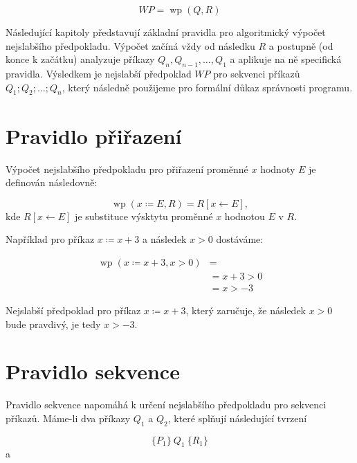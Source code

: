 \begin{equation*}
    WP = \operatorname{wp}(Q, R)
\end{equation*}

Následující kapitoly představují základní pravidla pro algoritmický výpočet nejslabšího předpokladu.
Výpočet začíná vždy od následku $R$ a postupně (od konce k začátku)
analyzuje příkazy $Q_n, Q_{n-1}, \ldots, Q_1$ a aplikuje na ně specifická pravidla.
Výsledkem je nejslabší předpoklad $WP$ pro sekvenci příkazů $Q_1; Q_2; \ldots; Q_n$,
který následně použijeme pro formální důkaz správnosti programu.

\section{Pravidlo přiřazení}
\label{sec:pravidlo-prirazeni}

Výpočet nejslabšího předpokladu pro přiřazení proměnné $x$ hodnoty $E$ je
definován následovně:

\begin{equation*}
    \operatorname{wp}(x \coloneqq E, R) = R[x \leftarrow E],
\end{equation*}
kde $R[x \leftarrow E]$ je substituce výsktytu proměnné $x$ hodnotou $E$ v $R$.

Například pro příkaz $x \coloneqq x + 3$ a následek $x > 0$ dostáváme:

\begin{align*}
    \operatorname{wp}(x \coloneqq x + 3, x > 0) & = \\
                                 & = x + 3 > 0 \\
                                 & = x > -3
\end{align*}

Nejslabší předpoklad pro příkaz $x \coloneqq x + 3$, který zaručuje, že
následek $x > 0$ bude pravdivý, je tedy $x > -3$.

\section{Pravidlo sekvence}
\label{sec:pravidlo-sekvence}

Pravidlo sekvence napomáhá k určení nejslabšího předpokladu pro sekvenci příkazů.
Máme-li dva příkazy $Q_1$ a $Q_2$, které splňují následující tvrzení

\begin{equation*}
    \{ P_1 \} \  Q_1 \  \{ R_1 \}
\end{equation*}
a


